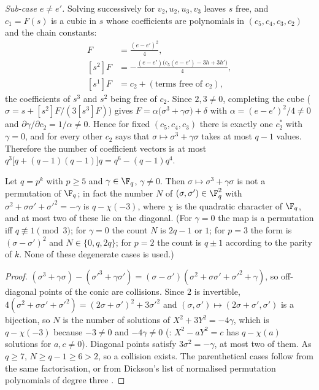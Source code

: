\emph{Sub-case $e\neq e'$.}  Solving successively for $v_2,u_2,u_3,v_3$ leaves $s$ free,
and $c_1=F(s)$ is a cubic in $s$ whose coefficients are polynomials in
$(c_5,c_4,c_3,c_2)$ and the chain constants:
\begin{align*}
   [s^3]F&=\frac{(e-e')^2}{4},\\
   [s^2]F&=-\frac{(e-e')\bigl(c_5(e-e')-3h+3h'\bigr)}{4},\\
   [s^1]F&=c_2+(\text{terms free of }c_2),
\end{align*}
the coefficients of $s^3$ and $s^2$ being free of $c_2$.  Since $2,3\neq0$, completing the
cube ($\sigma=s+[s^2]F/(3[s^3]F)$) gives
$F=\alpha\bigl(\sigma^3+\gamma\sigma\bigr)+\delta$ with $\alpha=(e-e')^2/4\neq0$ and
$\partial\gamma/\partial c_2=1/\alpha\neq0$.  Hence for fixed $(c_5,c_4,c_3)$ there is
exactly one $c_2^*$ with $\gamma=0$, and for every other $c_2$ 
says that $\sigma\mapsto\sigma^3+\gamma\sigma$ takes at most $q-1$ values.  Therefore the
number of coefficient vectors is at most $q^3\bigl[q+(q-1)(q-1)\bigr]q=q^6-(q-1)q^4$.

\begin{lemma}
\label{lem:charp-cubic}
Let $q=p^k$ with $p\ge5$ and $\gamma\in\F_q$, $\gamma\neq0$.  Then
$\sigma\mapsto\sigma^3+\gamma\sigma$ is not a permutation of $\F_q$; in fact the number
$N$ of $(\sigma,\sigma')\in\F_q^2$ with $\sigma^2+\sigma\sigma'+\sigma'^2=-\gamma$ is
$q-\chi(-3)$, where $\chi$ is the quadratic character of $\F_q$, and at most two of these
lie on the diagonal.  (For $\gamma=0$ the map is a permutation iff $q\not\equiv1\pmod3$;
for $\gamma=0$ the count $N$ is $2q-1$ or $1$; for $p=3$ the form is $(\sigma-\sigma')^2$
and $N\in\{0,q,2q\}$; for $p=2$ the count is $q\pm1$ according to the parity of $k$.
None of these degenerate cases is used.)
\end{lemma}

\begin{proof}
$(\sigma^3+\gamma\sigma)-(\sigma'^3+\gamma\sigma')=(\sigma-\sigma')(\sigma^2+\sigma\sigma'+\sigma'^2+\gamma)$,
so off-diagonal points of the conic are collisions.  Since $2$ is invertible,
$4(\sigma^2+\sigma\sigma'+\sigma'^2)=(2\sigma+\sigma')^2+3\sigma'^2$ and
$(\sigma,\sigma')\mapsto(2\sigma+\sigma',\sigma')$ is a bijection, so $N$ is the number of
solutions of $X^2+3Y^2=-4\gamma$, which is $q-\chi(-3)$ because $-3\neq0$ and $-4\gamma\neq0$
(\cite[Thm.~6.26]{lidl1997finite}: $X^2-aY^2=c$ has $q-\chi(a)$ solutions for $a,c\neq0$).
Diagonal points satisfy $3\sigma^2=-\gamma$, at most two of them.  As $q\ge7$,
$N\ge q-1\ge6>2$, so a collision exists.  The parenthetical cases follow from the same
factorisation, or from Dickson's list of normalised permutation polynomials of degree
three \cite[Table~7.1]{lidl1997finite}.
\end{proof}

